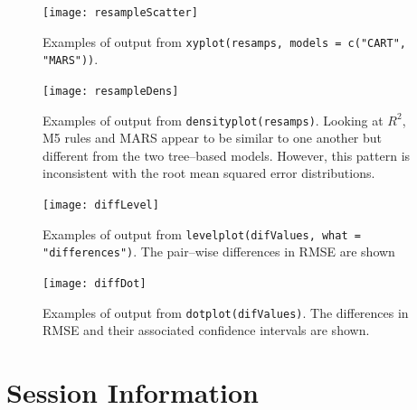 \documentclass[12pt]{article}
\newcommand{\code}[1]{\mbox{\footnotesize\color{darkblue}\texttt{#1}}}
\begin{document}
\begin{figure}
   \begin{center}		
      \texttt{[image: resampleScatter]}    

      \caption{ Examples of output from \code{xyplot(resamps, models = c("CART", "MARS"))}. }
      \label{f:resampleScatter} 
    \end{center}
\end{figure} 

\begin{figure}
   \begin{center}		
      \texttt{[image: resampleDens]}    

      \caption{ Examples of output from
        \code{densityplot(resamps)}. Looking at $R^2$, M5 rules and MARS appear to be
        similar to one another but different from the two tree--based
        models. However, this pattern is inconsistent with the root
        mean squared error distributions.}
      \label{F:resampleDens} 
    \end{center}
\end{figure} 


\begin{figure}
   \begin{center}		
      \texttt{[image: diffLevel]}    

      \caption{ Examples of output from \code{levelplot(difValues,
          what = "differences")}. The pair--wise differences in RMSE
        are shown}
      \label{F:diffLevel} 
    \end{center}
\end{figure} 


\begin{figure}
   \begin{center}		
      \texttt{[image: diffDot]}    

      \caption{ Examples of output from
        \code{dotplot(difValues)}. The differences in RMSE and their
        associated confidence intervals are shown.}
      \label{F:diffDot} 
    \end{center}
\end{figure} 


\section{Session Information}
\end{document}
